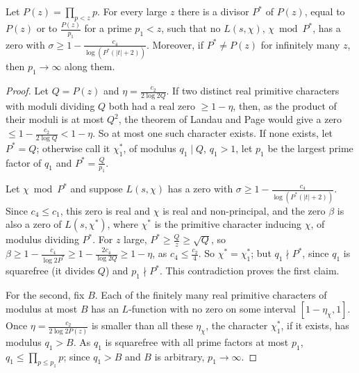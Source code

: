 \begin{lemma}\label{lem:goodmoduli}
Let $P(z)=\prod_{p<z}p$. For every large $z$ there is a divisor $P^*$ of $P(z)$, equal to $P(z)$ or to $\frac{P(z)}{p_1}$ for a prime $p_1<z$, such that no $L(s,\chi)$, $\chi\bmod P^*$, has a zero with $\sigma\ge1-\frac{c_4}{\log(P^*(|t|+2))}$. Moreover, if $P^*\ne P(z)$ for infinitely many $z$, then $p_1\to\infty$ along them.
\end{lemma}
\begin{proof}
Let $Q=P(z)$ and $\eta=\frac{c_2}{2\log2Q}$. If two distinct real primitive characters with moduli dividing $Q$ both had a real zero $\ge1-\eta$, then, as the product of their moduli is at most $Q^2$, the theorem of Landau and Page would give a zero $\le1-\frac{c_2}{2\log Q}<1-\eta$. So at most one such character exists. If none exists, let $P^*=Q$; otherwise call it $\chi_1^*$, of modulus $q_1\mid Q$, $q_1>1$, let $p_1$ be the largest prime factor of $q_1$ and $P^*=\frac Q{p_1}$.

Let $\chi\bmod P^*$ and suppose $L(s,\chi)$ has a zero with $\sigma\ge1-\frac{c_4}{\log(P^*(|t|+2))}$. Since $c_4\le c_1$, this zero is real and $\chi$ is real and non-principal, and the zero $\beta$ is also a zero of $L(s,\chi^*)$, where $\chi^*$ is the primitive character inducing $\chi$, of modulus dividing $P^*$. For $z$ large, $P^*\ge\frac Qz\ge\sqrt Q$, so $\beta\ge1-\frac{c_4}{\log2P^*}\ge1-\frac{2c_4}{\log2Q}\ge1-\eta$, as $c_4\le\frac{c_2}4$. So $\chi^*=\chi_1^*$; but $q_1\nmid P^*$, since $q_1$ is squarefree (it divides $Q$) and $p_1\nmid P^*$. This contradiction proves the first claim.

For the second, fix $B$. Each of the finitely many real primitive characters of modulus at most $B$ has an $L$-function with no zero on some interval $[1-\eta_\chi,1]$. Once $\eta=\frac{c_2}{2\log 2P(z)}$ is smaller than all these $\eta_\chi$, the character $\chi_1^*$, if it exists, has modulus $q_1>B$. As $q_1$ is squarefree with all prime factors at most $p_1$, $q_1\le\prod_{p\le p_1}p$; since $q_1>B$ and $B$ is arbitrary, $p_1\to\infty$.
\end{proof}

